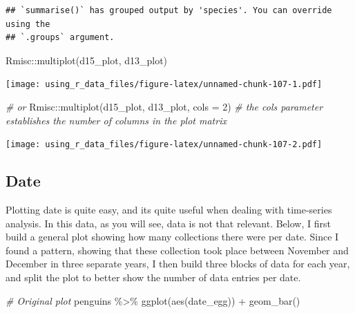 \documentclass[
]{book}
\newenvironment{Shaded}{\begin{snugshade}}{\end{snugshade}}
\newcommand{\AttributeTok}[1]{\textcolor[rgb]{0.77,0.63,0.00}{#1}}
\newcommand{\CommentTok}[1]{\textcolor[rgb]{0.56,0.35,0.01}{\textit{#1}}}
\newcommand{\DecValTok}[1]{\textcolor[rgb]{0.00,0.00,0.81}{#1}}
\newcommand{\FunctionTok}[1]{\textcolor[rgb]{0.00,0.00,0.00}{#1}}
\newcommand{\NormalTok}[1]{#1}
\newcommand{\SpecialCharTok}[1]{\textcolor[rgb]{0.00,0.00,0.00}{#1}}
\begin{document}
\begin{verbatim}
## `summarise()` has grouped output by 'species'. You can override using the
## `.groups` argument.
\end{verbatim}

\begin{Shaded}
\begin{Highlighting}[]
\NormalTok{Rmisc}\SpecialCharTok{::}\FunctionTok{multiplot}\NormalTok{(d15\_plot, d13\_plot)}
\end{Highlighting}
\end{Shaded}

\texttt{[image: using\_r\_data\_files/figure-latex/unnamed-chunk-107-1.pdf]}

\begin{Shaded}
\begin{Highlighting}[]
\CommentTok{\# or}
\NormalTok{Rmisc}\SpecialCharTok{::}\FunctionTok{multiplot}\NormalTok{(d15\_plot, d13\_plot, }\AttributeTok{cols =} \DecValTok{2}\NormalTok{)  }\CommentTok{\# the cols parameter establishes the number of columns in the plot matrix}
\end{Highlighting}
\end{Shaded}

\texttt{[image: using\_r\_data\_files/figure-latex/unnamed-chunk-107-2.pdf]}

\hypertarget{date-1}{%
\subsection{Date}\label{date-1}}

Plotting date is quite easy, and its quite useful when dealing with time-series analysis.
In this data, as you will see, data is not that relevant.
Below, I first build a general plot showing how many collections there were per date.
Since I found a pattern, showing that these collection took place between November and December in three separate years, I then build three blocks of data for each year, and split the plot to better show the number of data entries per date.

\begin{Shaded}
\begin{Highlighting}[]
\CommentTok{\# Original plot}
\NormalTok{penguins }\SpecialCharTok{\%\textgreater{}\%} 
  \FunctionTok{ggplot}\NormalTok{(}\FunctionTok{aes}\NormalTok{(date\_egg)) }\SpecialCharTok{+}
  \FunctionTok{geom\_bar}\NormalTok{()}
\end{Highlighting}
\end{Shaded}
\end{document}
